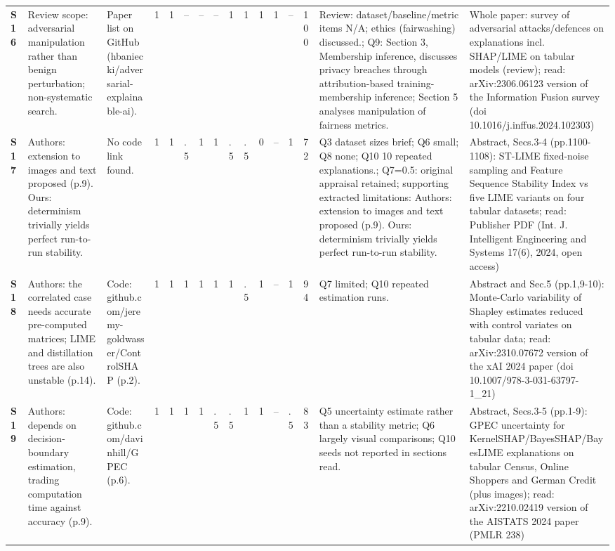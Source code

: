 \begin{longtable}{@{}P{1.0cm}P{4.6cm}P{3.6cm}P{0.3cm}P{0.3cm}P{0.3cm}P{0.3cm}P{0.3cm}P{0.3cm}P{0.3cm}P{0.3cm}P{0.3cm}P{0.36cm}P{0.75cm}P{3.0cm}P{3.9cm}@{}}
\textbf{S16} & Review scope: adversarial manipulation rather than benign perturbation; non-systematic search. & Paper list on GitHub (hbaniecki/\allowbreak{}adversarial-explainable-ai). & 1 & 1 & -- & -- & -- & 1 & 1 & 1 & 1 & -- & 100 & Review: dataset/\allowbreak{}baseline/\allowbreak{}metric items N/\allowbreak{}A; ethics (fairwashing) discussed.; Q9: Section 3, Membership inference, discusses privacy breaches through attribution-based training-membership inference; Section 5 analyses manipulation of fairness metrics. & Whole paper: survey of adversarial attacks/\allowbreak{}defences on explanations incl. SHAP/\allowbreak{}LIME on tabular models (review); read: arXiv:2306.06123 version of the Information Fusion survey (doi 10.1016/\allowbreak{}j.inffus.2024.102303) \\
\textbf{S17} & Authors: extension to images and text proposed (p.9). Ours: determinism trivially yields perfect run-to-run stability. & No code link found. & 1 & 1 & .5 & 1 & 1 & .5 & .5 & 0 & -- & 1 & 72 & Q3 dataset sizes brief; Q6 small; Q8 none; Q10 10 repeated explanations.; Q7=0.5: original appraisal retained; supporting extracted limitations: Authors: extension to images and text proposed (p.9). Ours: determinism trivially yields perfect run-to-run stability. & Abstract, Secs.3-4 (pp.1100-1108): ST-LIME fixed-noise sampling and Feature Sequence Stability Index vs five LIME variants on four tabular datasets; read: Publisher PDF (Int. J. Intelligent Engineering and Systems 17(6), 2024, open access) \\
\textbf{S18} & Authors: the correlated case needs accurate pre-computed matrices; LIME and distillation trees are also unstable (p.14). & Code: github.com/\allowbreak{}jeremy-goldwasser/\allowbreak{}ControlSHAP (p.2). & 1 & 1 & 1 & 1 & 1 & 1 & .5 & 1 & -- & 1 & 94 & Q7 limited; Q10 repeated estimation runs. & Abstract and Sec.5 (pp.1,9-10): Monte-Carlo variability of Shapley estimates reduced with control variates on tabular data; read: arXiv:2310.07672 version of the xAI 2024 paper (doi 10.1007/\allowbreak{}978-3-031-63797-1\_\allowbreak{}21) \\
\textbf{S19} & Authors: depends on decision-boundary estimation, trading computation time against accuracy (p.9). & Code: github.com/\allowbreak{}davinhill/\allowbreak{}GPEC (p.6). & 1 & 1 & 1 & 1 & .5 & .5 & 1 & 1 & -- & .5 & 83 & Q5 uncertainty estimate rather than a stability metric; Q6 largely visual comparisons; Q10 seeds not reported in sections read. & Abstract, Secs.3-5 (pp.1-9): GPEC uncertainty for KernelSHAP/\allowbreak{}BayesSHAP/\allowbreak{}BayesLIME explanations on tabular Census, Online Shoppers and German Credit (plus images); read: arXiv:2210.02419 version of the AISTATS 2024 paper (PMLR 238) \\

\end{longtable}
